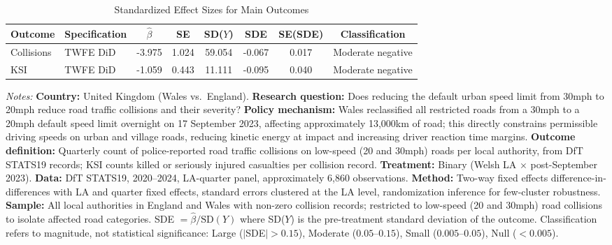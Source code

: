 \begin{table}[H]
\centering
\caption{Standardized Effect Sizes for Main Outcomes}
\label{tab:sde}
\begin{tabular}{l l cccccc}
\toprule
Outcome & Specification & $\hat{\beta}$ & SE & SD($Y$) & SDE & SE(SDE) & Classification \\
\midrule
Collisions & TWFE DiD & -3.975 & 1.024 & 59.054 & -0.067 & 0.017 & Moderate negative \\
KSI & TWFE DiD & -1.059 & 0.443 & 11.111 & -0.095 & 0.040 & Moderate negative \\
\bottomrule
\end{tabular}
\par\vspace{0.3em}
{\footnotesize\sloppy
\textit{Notes:} \textbf{Country:} United Kingdom (Wales vs.\ England). \textbf{Research question:} Does reducing the default urban speed limit from 30mph to 20mph reduce road traffic collisions and their severity? \textbf{Policy mechanism:} Wales reclassified all restricted roads from a 30mph to a 20mph default speed limit overnight on 17 September 2023, affecting approximately 13,000km of road; this directly constrains permissible driving speeds on urban and village roads, reducing kinetic energy at impact and increasing driver reaction time margins. \textbf{Outcome definition:} Quarterly count of police-reported road traffic collisions on low-speed (20 and 30mph) roads per local authority, from DfT STATS19 records; KSI counts killed or seriously injured casualties per collision record. \textbf{Treatment:} Binary (Welsh LA $\times$ post-September 2023). \textbf{Data:} DfT STATS19, 2020--2024, LA-quarter panel, approximately 6,860 observations. \textbf{Method:} Two-way fixed effects difference-in-differences with LA and quarter fixed effects, standard errors clustered at the LA level, randomization inference for few-cluster robustness. \textbf{Sample:} All local authorities in England and Wales with non-zero collision records; restricted to low-speed (20 and 30mph) road collisions to isolate affected road categories. SDE $= \hat{\beta} / \text{SD}(Y)$ where SD($Y$) is the pre-treatment standard deviation of the outcome. Classification refers to magnitude, not statistical significance: Large ($|$SDE$| > 0.15$), Moderate ($0.05$--$0.15$), Small ($0.005$--$0.05$), Null ($< 0.005$).
}
\end{table}
